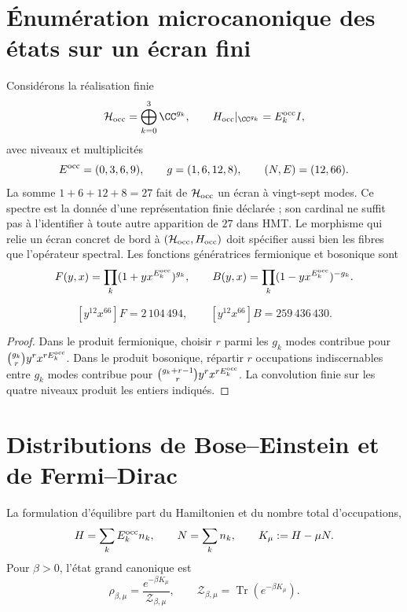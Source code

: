 \section{Énumération microcanonique des états sur un écran fini}

Considérons la réalisation finie
\[
 \mathcal H_{\rm occ}=\bigoplus_{k=0}^{3}\CC^{g_k},
 \qquad
 H_{\rm occ}|_{\CC^{g_k}}=E_k^{\rm occ} I,
\]
avec niveaux et multiplicités
\[
 E^{\rm occ}=(0,3,6,9),\qquad g=(1,6,12,8),
 \qquad(N,E)=(12,66).
\]
La somme \(1+6+12+8=27\) fait de \(\mathcal H_{\rm occ}\) un écran à
vingt-sept modes. Ce spectre est la donnée d’une représentation finie
déclarée ; son cardinal ne suffit pas à l’identifier à toute autre
apparition de \(27\) dans HMT\@. Le morphisme qui relie un écran concret
de bord à \((\mathcal H_{\rm occ},H_{\rm occ})\) doit spécifier aussi bien
les fibres que l’opérateur spectral.
Les fonctions génératrices fermionique et bosonique sont
\[
 F(y,x)=\prod_k(1+yx^{E_k^{\rm occ}})^{g_k},
 \qquad
 B(y,x)=\prod_k(1-yx^{E_k^{\rm occ}})^{-g_k}.
\]

\begin{proposition}
\label{prop:cardinalidades-microcanonicas}
\[
 [y^{12}x^{66}]F=2\,104\,494,
 \qquad
 [y^{12}x^{66}]B=259\,436\,430.
\]
\end{proposition}
\begin{proof}
Dans le produit fermionique, choisir \(r\) parmi les \(g_k\) modes contribue pour
\(\binom{g_k}{r}y^rx^{rE_k^{\rm occ}}\). Dans le produit bosonique, répartir \(r\)
occupations indiscernables entre \(g_k\) modes contribue pour
\(\binom{g_k+r-1}{r}y^rx^{rE_k^{\rm occ}}\). La convolution finie sur les
quatre niveaux produit les entiers indiqués.
\end{proof}

\section{Distributions de Bose--Einstein et de Fermi--Dirac}

La formulation d’équilibre part du Hamiltonien et du nombre total
d’occupations,
\begin{equation}
 H=\sum_kE_k^{\rm occ} n_k,
 \qquad
 N=\sum_k n_k,
 \qquad
 K_\mu:=H-\mu N.
 \label{eq:hamiltoniano-gran-canonico-rev3}
\end{equation}
Pour \(\beta>0\), l’état grand canonique est
\begin{equation}
 \rho_{\beta,\mu}
 =\frac{e^{-\beta K_\mu}}{\mathcal Z_{\beta,\mu}},
 \qquad
 \mathcal Z_{\beta,\mu}
 =\operatorname{Tr}(e^{-\beta K_\mu}).
 \label{eq:estado-gran-canonico-rev3}
\end{equation}

